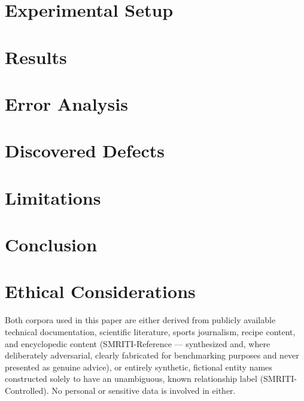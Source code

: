 \documentclass[11pt]{article}
\begin{document}


\section{Experimental Setup}
\label{sec:experiments}


\section{Results}
\label{sec:results}


\section{Error Analysis}
\label{sec:error-analysis}


\section{Discovered Defects}
\label{sec:bugs}


\section{Limitations}
\label{sec:limitations}


\section{Conclusion}
\label{sec:conclusion}


\section*{Ethical Considerations}
Both corpora used in this paper are either derived from publicly available
technical documentation, scientific literature, sports journalism, recipe
content, and encyclopedic content (SMRITI-Reference --- synthesized and,
where deliberately adversarial, clearly fabricated for benchmarking
purposes and never presented as genuine advice), or entirely synthetic,
fictional entity names constructed solely to have an unambiguous, known
relationship label (SMRITI-Controlled). No personal or sensitive data is
involved in either.


\end{document}
